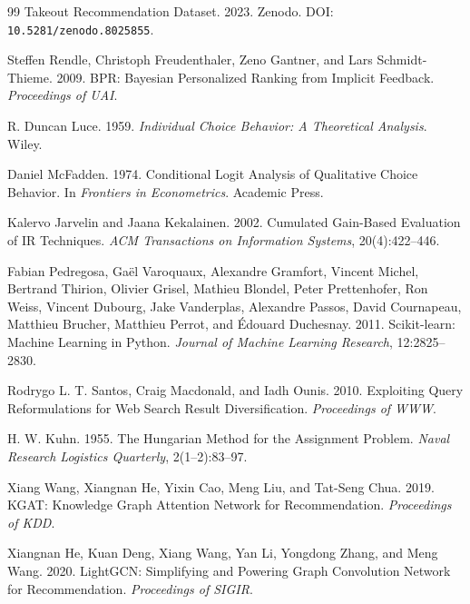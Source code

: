\documentclass[12pt,a4paper]{article}
\begin{document}
    \begin{thebibliography}{99}
        Takeout Recommendation Dataset. 2023. Zenodo. DOI: \texttt{10.5281/zenodo.8025855}.

        Steffen Rendle, Christoph Freudenthaler, Zeno Gantner, and Lars Schmidt-Thieme. 2009. BPR: Bayesian Personalized Ranking from Implicit Feedback. \textit{Proceedings of UAI}.

        R. Duncan Luce. 1959. \textit{Individual Choice Behavior: A Theoretical Analysis}. Wiley.

        Daniel McFadden. 1974. Conditional Logit Analysis of Qualitative Choice Behavior. In \textit{Frontiers in Econometrics}. Academic Press.

        Kalervo Jarvelin and Jaana Kekalainen. 2002. Cumulated Gain-Based Evaluation of IR Techniques. \textit{ACM Transactions on Information Systems}, 20(4):422--446.


        
        Fabian Pedregosa, Gaël Varoquaux, Alexandre Gramfort, Vincent Michel, Bertrand Thirion, Olivier Grisel, Mathieu Blondel, Peter Prettenhofer, Ron Weiss, Vincent Dubourg, Jake Vanderplas, Alexandre Passos, David Cournapeau, Matthieu Brucher, Matthieu Perrot, and Édouard Duchesnay. 2011. Scikit-learn: Machine Learning in Python. \textit{Journal of Machine Learning Research}, 12:2825--2830.

        Rodrygo L. T. Santos, Craig Macdonald, and Iadh Ounis. 2010. Exploiting Query Reformulations for Web Search Result Diversification. \textit{Proceedings of WWW}.

        H. W. Kuhn. 1955. The Hungarian Method for the Assignment Problem. \textit{Naval Research Logistics Quarterly}, 2(1--2):83--97.

        Xiang Wang, Xiangnan He, Yixin Cao, Meng Liu, and Tat-Seng Chua. 2019. KGAT: Knowledge Graph Attention Network for Recommendation. \textit{Proceedings of KDD}.

        Xiangnan He, Kuan Deng, Xiang Wang, Yan Li, Yongdong Zhang, and Meng Wang. 2020. LightGCN: Simplifying and Powering Graph Convolution Network for Recommendation. \textit{Proceedings of SIGIR}.
    \end{thebibliography}
\end{document}

